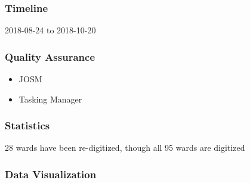 \documentclass[a4paper,12pt,twoside]{article}
\begin{document}
\subsubsection{Timeline}
2018-08-24 to 2018-10-20

\subsubsection{Quality Assurance}
\begin{itemize}
    \item JOSM
    \item Tasking Manager
\end{itemize}

\subsubsection{Statistics}
28 wards have been re-digitized, though all 95 wards are digitized

\subsubsection{Data Visualization}
\end{document}
